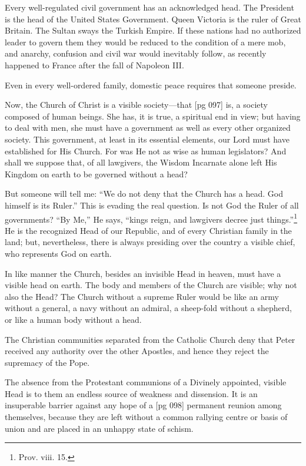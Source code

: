 Every well-regulated civil government has an
acknowledged head. The President is the head
of the United States Government. Queen Victoria
is the ruler of Great Britain. The Sultan
sways the Turkish Empire. If these nations had
no authorized leader to govern them they would
be reduced to the condition of a mere mob, and
anarchy, confusion and civil war would inevitably
follow, as recently happened to France after the
fall of Napoleon III.

Even in every well-ordered family, domestic
peace requires that someone preside.

Now, the Church of Christ is a visible society—that
[pg 097]
is, a society composed of human beings. She
has, it is true, a spiritual end in view; but having
to deal with men, she must have a government
as well as every other organized society. This
government, at least in its essential elements, our
Lord must have established for His Church. For
was He not as wise as human legislators? And
shall we suppose that, of all lawgivers, the Wisdom
Incarnate alone left His Kingdom on earth
to be governed without a head?

But someone will tell me: “We do not deny
that the Church has a head. God himself is its
Ruler.” This is evading the real question. Is
not God the Ruler of all governments? “By Me,”
He says, “kings reign, and lawgivers decree just
things.”\footnote{Prov. viii.
15.} He is the recognized Head of our Republic,
and of every Christian family in the land;
but, nevertheless, there is always presiding over
the country a visible chief, who represents God
on earth.

In like manner the Church, besides an invisible
Head in heaven, must have a visible head on
earth. The body and members of the Church are
visible; why not also the Head? The Church without
a supreme Ruler would be like an army without
a general, a navy without an admiral, a sheep-fold
without a shepherd, or like a human body
without a head.

The Christian communities separated from the
Catholic Church deny that Peter received any authority
over the other Apostles, and hence they
reject the supremacy of the Pope.

The absence from the Protestant communions
of a Divinely appointed, visible Head is to them
an endless source of weakness and dissension. It
is an insuperable barrier against any hope of a
[pg 098]
permanent reunion among themselves, because
they are left without a common rallying centre or
basis of union and are placed in an unhappy state
of schism.

